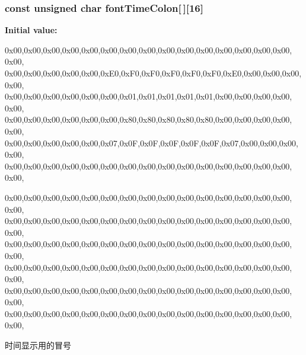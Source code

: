 \hypertarget{group___w_i_d_g_e_t_ga934cfdf8aedca0ff9a8794005da8d5e0}{
\subsubsection[{font\-Time\-Colon}]{\setlength{\rightskip}{0pt plus 5cm}const unsigned char {\bf font\-Time\-Colon}\mbox{[}$\,$\mbox{]}\mbox{[}16\mbox{]}}}\label{group___w_i_d_g_e_t_ga934cfdf8aedca0ff9a8794005da8d5e0}
{\bfseries \-Initial value\-:}
\begin{DoxyCode}

{
        
{0x00,0x00,0x00,0x00,0x00,0x00,0x00,0x00,0x00,0x00,0x00,0x00,0x00,0x00,0x00,
      0x00},
{0x00,0x00,0x00,0x00,0x00,0xE0,0xF0,0xF0,0xF0,0xF0,0xF0,0xE0,0x00,0x00,0x00,
      0x00},
{0x00,0x00,0x00,0x00,0x00,0x00,0x01,0x01,0x01,0x01,0x01,0x00,0x00,0x00,0x00,
      0x00},
{0x00,0x00,0x00,0x00,0x00,0x00,0x80,0x80,0x80,0x80,0x80,0x00,0x00,0x00,0x00,
      0x00},
{0x00,0x00,0x00,0x00,0x00,0x07,0x0F,0x0F,0x0F,0x0F,0x0F,0x07,0x00,0x00,0x00,
      0x00},
{0x00,0x00,0x00,0x00,0x00,0x00,0x00,0x00,0x00,0x00,0x00,0x00,0x00,0x00,0x00,
      0x00},


{0x00,0x00,0x00,0x00,0x00,0x00,0x00,0x00,0x00,0x00,0x00,0x00,0x00,0x00,0x00,
      0x00},
{0x00,0x00,0x00,0x00,0x00,0x00,0x00,0x00,0x00,0x00,0x00,0x00,0x00,0x00,0x00,
      0x00},
{0x00,0x00,0x00,0x00,0x00,0x00,0x00,0x00,0x00,0x00,0x00,0x00,0x00,0x00,0x00,
      0x00},
{0x00,0x00,0x00,0x00,0x00,0x00,0x00,0x00,0x00,0x00,0x00,0x00,0x00,0x00,0x00,
      0x00},
{0x00,0x00,0x00,0x00,0x00,0x00,0x00,0x00,0x00,0x00,0x00,0x00,0x00,0x00,0x00,
      0x00},
{0x00,0x00,0x00,0x00,0x00,0x00,0x00,0x00,0x00,0x00,0x00,0x00,0x00,0x00,0x00,
      0x00},


}
\end{DoxyCode}


时间显示用的冒号 

